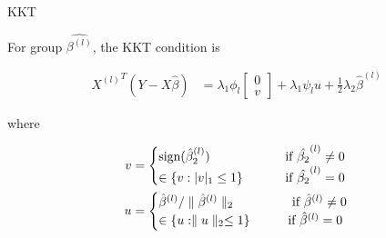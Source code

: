\documentclass[12pt]{article}
\begin{document}
KKT \cite{tibshirani2013lasso}

For group $\hat{\beta^{(l)}}$, the KKT condition is 

\begin{align}
  {X^{(l)}}^T(Y-X\hat{\beta}) &= \lambda_1\phi_l \begin{bmatrix}
         0 \\
         v 
       \end{bmatrix}
       + \lambda_1\psi_lu+\frac{1}{2}\lambda_2\hat{\beta}^{(l)}
\end{align}

where

\begin{align}
v & = \begin{cases}
  \text{sign}(\hat{\beta}_2^{(l)}) & \text{ \qquad  if $\hat{\beta_2}^{(l)}\neq 0$} \\
  \in\{v:|v|_1\leq 1\}&  \text{ \qquad  if $\hat{\beta_2}^{(l)}= 0$} 
\end{cases}
\\
u & = \begin{cases} 
  \hat{\beta}^{(l)}/\parallel \hat{\beta}^{(l)} \parallel_2 & 
  \text{ \qquad  if $\hat{\beta}^{(l)}\neq 0$} \\
  \in \{u:\parallel u\parallel_2\leq 1\} & \text{\qquad if $\hat{\beta}^{(l)}= 0$}
\end{cases} 
\end{align}
\end{document}
